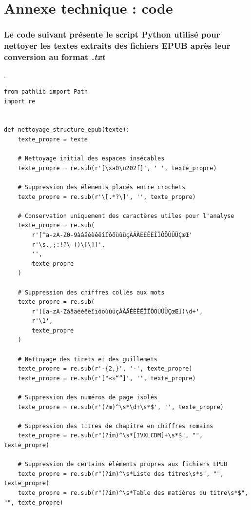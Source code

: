 \chapter*{Annexe technique : code}

\subsection{Le code suivant présente le script Python utilisé pour nettoyer les textes extraits des fichiers EPUB après leur conversion au format \textsl{.txt}}.

\begin{verbatim}
from pathlib import Path
import re


def nettoyage_structure_epub(texte):
    texte_propre = texte

    # Nettoyage initial des espaces insécables
    texte_propre = re.sub(r'[\xa0\u202f]', ' ', texte_propre)

    # Suppression des éléments placés entre crochets
    texte_propre = re.sub(r'\[.*?\]', '', texte_propre)

    # Conservation uniquement des caractères utiles pour l'analyse
    texte_propre = re.sub(
        r'[^a-zA-Z0-9àâäéèêëîïôöùûüçÀÂÄÉÈÊËÎÏÔÖÙÛÜÇœŒ'
        r'\s.,;:!?\-()\[\]]',
        '',
        texte_propre
    )

    # Suppression des chiffres collés aux mots
    texte_propre = re.sub(
        r'([a-zA-ZàâäéèêëîïôöùûüçÀÂÄÉÈÊËÎÏÔÖÙÛÜÇœŒ])\d+',
        r'\1',
        texte_propre
    )

    # Nettoyage des tirets et des guillemets
    texte_propre = re.sub(r'-{2,}', '-', texte_propre)
    texte_propre = re.sub(r'["«»“”]', '', texte_propre)

    # Suppression des numéros de page isolés
    texte_propre = re.sub(r'(?m)^\s*\d+\s*$', '', texte_propre)

    # Suppression des titres de chapitre en chiffres romains
    texte_propre = re.sub(r"(?im)^\s*[IVXLCDM]+\s*$", "", texte_propre)

    # Suppression de certains éléments propres aux fichiers EPUB
    texte_propre = re.sub(r"(?im)^\s*Liste des titres\s*$", "", texte_propre)
    texte_propre = re.sub(r"(?im)^\s*Table des matières du titre\s*$", "", texte_propre)


\end{verbatim}
